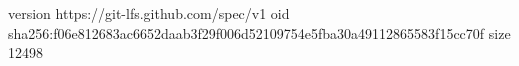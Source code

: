 version https://git-lfs.github.com/spec/v1
oid sha256:f06e812683ac6652daab3f29f006d52109754e5fba30a49112865583f15cc70f
size 12498
